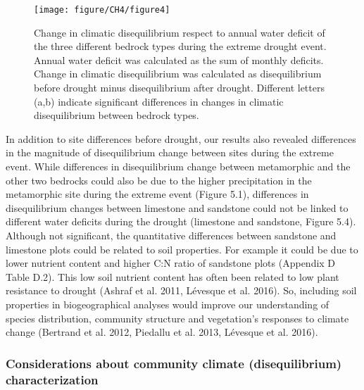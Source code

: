 \documentclass[11pt,twoside]{reedthesis}
\begin{document}
\setlength{\abovecaptionskip}{10pt}
\begin{figure}[hbt!]

{\centering \texttt{[image: figure/CH4/figure4]} 

}

\caption[Change in climatic disequilibrium respect to annual water deficit]{Change in climatic disequilibrium respect to annual water deficit of the three different bedrock types during the extreme drought event. Annual water deficit was calculated as the sum of monthly deficits. Change in climatic disequilibrium was calculated as disequilibrium before drought minus disequilibrium after drought. Different letters (a,b) indicate significant differences in changes in climatic disequilibrium between bedrock types.}\label{fig:Ch4plot4}
\end{figure}
In addition to site differences before drought, our results also
revealed differences in the magnitude of disequilibrium change between
sites during the extreme event. While differences in disequilibrium
change between metamorphic and the other two bedrocks could also be due
to the higher precipitation in the metamorphic site during the extreme
event (Figure 5.1), differences in disequilibrium changes between
limestone and sandstone could not be linked to different water deficits
during the drought (limestone and sandstone, Figure 5.4). Although not
significant, the quantitative differences between sandstone and
limestone plots could be related to soil properties. For example it
could be due to lower nutrient content and higher C:N ratio of sandstone
plots (Appendix D Table D.2). This low soil nutrient content has often
been related to low plant resistance to drought (Ashraf et al. 2011,
Lévesque et al. 2016). So, including soil properties in biogeographical
analyses would improve our understanding of species distribution,
community structure and vegetation's responses to climate change
(Bertrand et al. 2012, Piedallu et al. 2013, Lévesque et al. 2016).\par

\subsubsection{Considerations about community climate (disequilibrium)
characterization}\label{considerations-about-community-climate-disequilibrium-characterization}
\end{document}
